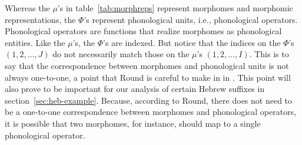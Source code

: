   Whereas the $\mu$'s in table~\ref{tab:morphreps} represent 
  morphomes and morphomic representations, the $\Phi$'s represent 
  phonological units, i.e., phonological operators. Phonological operators are functions that realize morphomes as phonological entities. 
  Like the $\mu$'s, 
  the $\Phi$'s are indexed. But notice that the  indices on the $\Phi$'s $(1,2,\dots,J)$ 
  do not necessarily match those on the $\mu$'s $(1,2,\dots,I)$. This is to say that
the correspondence between 
  morphomes and phonological units is not always one-to-one, a point that Round is careful to make in 
  in \cite{round:2015}. This point
  will also prove to be important for our analysis of certain Hebrew 
  suffixes in section~\ref{sec:heb-example}. Because, according to Round, there does not need to be a one-to-one correspondence between morphomes and phonological operators, it is possible that two morphomes, for instance, should map to a single phonological operator. 
